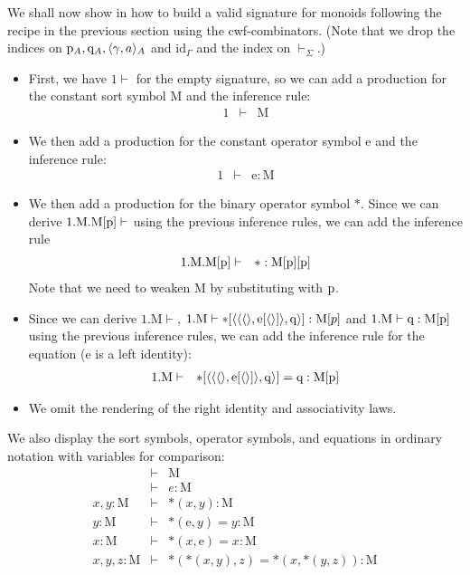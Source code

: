 \documentclass{lmcs}
\def\id{\mathrm{id}}
\def\Mon{\mathrm{M}}
\def\idmon{\mathrm{e}}
\def\comp{\mathrm{*}}
\begin{document}
We shall now show in how to build a valid signature for monoids following the recipe in the previous section using the cwf-combinators. (Note that we drop the indices on $\mathrm{p}_A, \mathrm{q}_A,\langle \gamma,a \rangle_A$ and $\id_\Gamma$
and the index on $\vdash_\Sigma$.)
\begin{itemize}
\item 
First, we have $1 \vdash$ for the empty signature, so we can add a production for the constant sort symbol $\Mon$ and the inference rule:
\begin{eqnarray*}
1 &\vdash& \Mon
\end{eqnarray*}
\item
We then add a production for the constant operator symbol $\idmon$ and the inference rule:
\begin{eqnarray*}
1 &\vdash& \idmon : \Mon
\end{eqnarray*}
\item
We then add a production for the binary operator symbol $\comp$. Since we can derive
$1.\Mon.\Mon[\p] \vdash$ using the previous inference rules, we can add the inference rule
\begin{eqnarray*}
1.\Mon.\Mon[\p] &\vdash& \comp : \Mon[\p][\p]
\end{eqnarray*}
Note that we need to weaken $\Mon$ by substituting with $\mathrm{p}$.
\item
Since we can derive $1.\Mon \vdash$, $1.\Mon \vdash \comp[\tuple{\tuple{\tuple{},\idmon[\tuple{}]},\q}] : \Mon[p]$ and $1.\Mon \vdash \q : \Mon[\p]$ using the previous inference rules, we can add the inference rule for the equation ($\idmon$ is a left identity):
\begin{eqnarray*}
1.\Mon &\vdash& \comp[\tuple{\tuple{\tuple{},\idmon[\tuple{}]},\q}] = \q : \Mon[\p]
\end{eqnarray*}
\item
We omit the rendering of the right identity and associativity laws.
\end{itemize}
We also display the sort symbols, operator symbols, and equations in ordinary notation with variables for comparison:
\begin{eqnarray*}
&\vdash& \Mon\\
&\vdash& e : \Mon\\
x, y : \Mon &\vdash& \comp(x,y) : \Mon\\
y : \Mon &\vdash& \comp(\idmon,y) = y : \Mon\\
x : \Mon &\vdash& \comp(x,\idmon) = x : \Mon\\
x, y, z : \Mon &\vdash& \comp(\comp(x,y),z) = \comp(x,\comp(y,z)) : \Mon
\end{eqnarray*}
\end{document}
